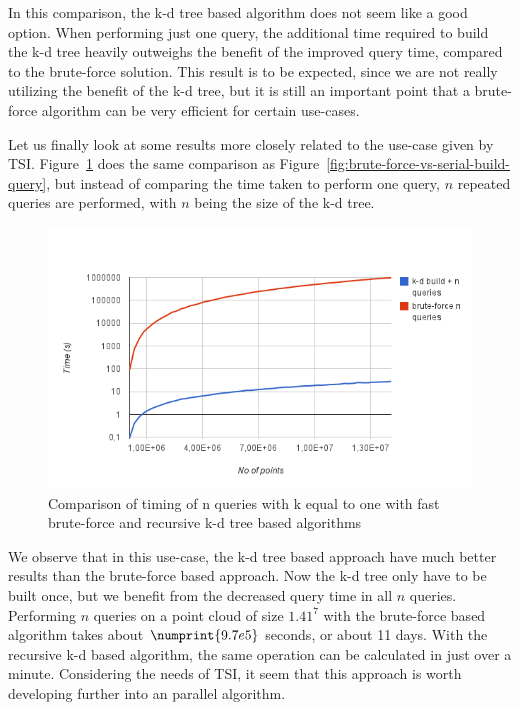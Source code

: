 In this comparison, the k-d tree based algorithm does not seem like a good option. When performing just one query, the additional time required to build the k-d tree heavily outweighs the benefit of the improved query time, compared to the brute-force solution. This result is to be expected, since we are not really utilizing the benefit of the k-d tree, but it is still an important point that a brute-force algorithm can be very efficient for certain use-cases.

Let us finally look at some results more closely related to the use-case given by TSI\@. Figure~\ref{fig:brute-force-vs-serial-build-n-queries} does the same comparison as Figure~\ref{fig:brute-force-vs-serial-build-query}, but instead of comparing the time taken to perform one query, $n$ repeated queries are performed, with $n$ being the size of the k-d tree.

\begin{figure}[ht!]
    \centering
    \includegraphics[width=120mm]{../gfx/brute-force-vs-serial-build-n-queries.png}
    \caption{Comparison of timing of n queries with k equal to one with fast brute-force and recursive k-d tree based algorithms}
    \label{fig:brute-force-vs-serial-build-n-queries}
\end{figure}

We observe that in this use-case, the k-d tree based approach have much better results than the brute-force based approach. Now the k-d tree only have to be built once, but we benefit from the decreased query time in all $n$ queries. Performing $n$ queries on a point cloud of size $1.41^7$ with the brute-force based algorithm takes about $\numprint{9.7e5}$ seconds, or about 11 days. With the recursive k-d based algorithm, the same operation can be calculated in just over a minute. Considering the needs of TSI, it seem that this approach is worth developing further into an parallel algorithm.

